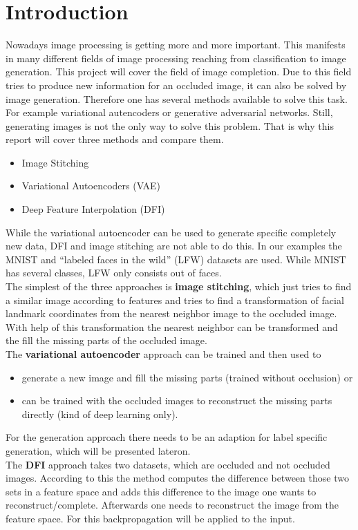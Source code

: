 \documentclass[
     11pt,         %
     a4paper,      %
     oneside,
     ]{article}
\begin{document}
\section{Introduction}
Nowadays image processing is getting more and more important. This manifests in many different fields of image processing reaching from classification to image generation.
This project will cover the field of image completion. Due to this field tries to produce new information for an occluded image, it can also be solved by image generation.
Therefore one has several methods available to solve this task. For example variational autencoders or generative adversarial networks. Still, generating images is not the only way to solve this problem. That is why this report will cover three methods and compare them.
\begin{itemize}
  \item Image Stitching
  \item Variational Autoencoders (VAE)
  \item Deep Feature Interpolation (DFI)
\end{itemize}
While the variational autoencoder can be used to generate specific completely new data, DFI and image stitching are not able to do this.
In our examples the MNIST and \enquote{labeled faces in the wild} (LFW) datasets are used. While MNIST has several classes, LFW only consists out of faces. \\
The simplest of the three approaches is \textbf{image stitching}, which just tries to find a similar image according to features and tries to find a transformation of facial landmark coordinates from the nearest neighbor image to the occluded image. With help of this transformation the nearest neighbor can be transformed and the fill the missing parts of the occluded image.\\
The \textbf{variational autoencoder} approach can be trained and then used to
\begin{itemize}
  \item generate a new image and fill the missing parts (trained without occlusion) or
  \item can be trained with the occluded images to reconstruct the missing parts directly (kind of deep learning only).
\end{itemize}
For the generation approach there needs to be an adaption for label specific generation, which will be presented lateron. \\
The \textbf{DFI} approach takes two datasets, which are occluded and not occluded images. According to this the method computes the difference between those two sets in a feature space and adds this difference to the image one wants to reconstruct/complete. Afterwards one needs to reconstruct the image from the feature space. For this backpropagation will be applied to the input.
\end{document}
